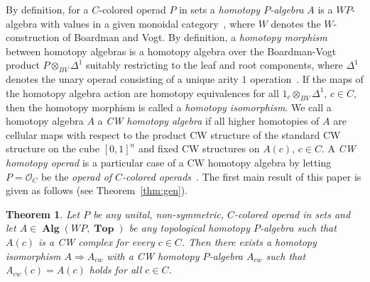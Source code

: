 \documentclass{amsart}
\newcounter{thmMaincounter}
\newtheorem{theoremM}[thmMaincounter]{Theorem}
\theoremstyle{definition}
\theoremstyle{remark}
\DeclareMathOperator{\Top}{\mathbf{Top}}
\DeclareMathOperator{\Alg}{\mathbf{Alg}}
\begin{document}
	By definition, for a $C$-colored operad $P$ in sets a \textit{homotopy $P$-algebra} $A$ is a $WP$-algebra with values in a given monoidal category~\cite{we-07}, where $W$ denotes the $W$-construction of Boardman and Vogt.
	By definition, a \textit{homotopy morphism} between homotopy algebras is a homotopy algebra over the Boardman-Vogt product $P\otimes_{BV} \Delta^{1}$ suitably restricting to the leaf and root components, where $\Delta^{1}$ denotes the unary operad consisting of a unique arity $1$ operation~\cite{we-07}.
	If the maps of the homotopy algebra action are homotopy equivalences for all $1_{c}\otimes_{BV}\Delta^{1}$, $c\in C$, then the homotopy morphism is called a \textit{homotopy isomorphism}.
	We call a homotopy algebra $A$ a \textit{CW homotopy algebra} if all higher homotopies of $A$ are cellular maps with respect to the product CW structure of the standard CW structure on the cube $[0,1]^{n}$ and fixed CW structures on $A(c)$, $c\in C$.
	A \textit{CW homotopy operad} is a particular case of a CW homotopy algebra by letting $P=\mathcal{O}_{C}$ be the \textit{operad of $C$-colored operads}~\cite[\S 1.5.6, \S 1.5.7]{be-mo-06}.
	The first main result of this paper is given as follows (see Theorem~\ref{thm:gen}).
	
	\begin{theoremM}\label{thmm:cwapp}
		Let $P$ be any unital, non-symmetric, $C$-colored operad in sets and let $A\in \Alg(WP,\Top)$ be any topological homotopy $P$-algebra such that $A(c)$ is a CW complex for every $c\in C$.
		Then there exists a homotopy isomorphism $A\Rightarrow A_{cw}$ with a CW homotopy $P$-algebra $A_{cw}$ such that $A_{cw}(c)=A(c)$ holds for all $c\in C$.
	\end{theoremM}
	
\end{document}
